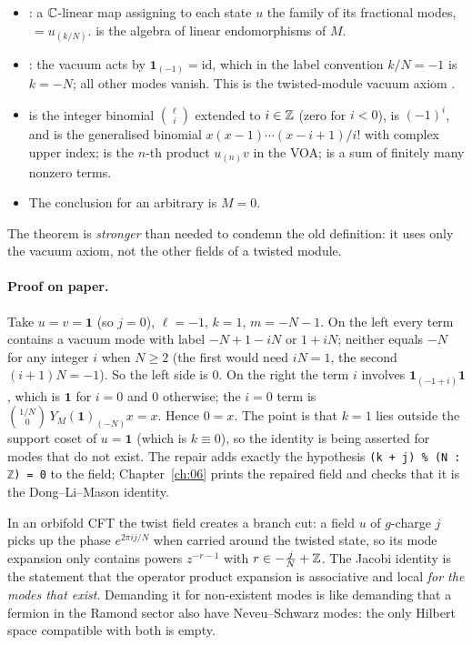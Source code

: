 \begin{dictionary}
\begin{itemize}
\item {}: a ${\mathbb{C}}$-linear map assigning to each state $u$ the family
  of its fractional modes, $\,=u_{(k/N)}$.  is the algebra of linear
  endomorphisms of $M$.
\item {}: the vacuum acts by $\mathbf 1_{(-1)}=\mathrm{id}$, which in the label convention
  $k/N=-1$ is $k=-N$; all other modes vanish. This is the twisted-module vacuum axiom
  .
\item {} is the integer binomial $\binom{\ell}{i}$ extended to $i\in{\mathbb{Z}}$ (zero for
  $i<0$),  is $(-1)^i$, and  is the generalised binomial
  $x(x-1)\cdots(x-i+1)/i!$ with complex upper index;  is the $n$-th product
  $u_{(n)}v$ in the VOA;  is a sum of finitely many nonzero terms.
\item The conclusion  for an arbitrary  is $M=0$.
\end{itemize}
The theorem is \emph{stronger} than needed to condemn the old definition: it uses only the vacuum
axiom, not the other fields of a twisted module.
\end{dictionary}

\paragraph{Proof on paper.} Take $u=v=\mathbf 1$ (so $j=0$), $\ell=-1$, $k=1$, $m=-N-1$. On the left
every term contains a vacuum mode with label $-N+1-iN$ or $1+iN$; neither equals $-N$ for any
integer $i$ when $N\ge 2$ (the first would need $iN=1$, the second $(i+1)N=-1$). So the left side is
$0$. On the right the term $i$ involves $\mathbf 1_{(-1+i)}\mathbf 1$, which is $\mathbf 1$ for $i=0$
and $0$ otherwise; the $i=0$ term is $\binom{1/N}{0}\,Y_M(\mathbf 1)_{(-N)}x=x$. Hence $0=x$.
The point is that $k=1$ lies outside the support coset of $u=\mathbf 1$ (which is $k\equiv 0$), so
the identity is being asserted for modes that do not exist. The repair adds exactly the hypothesis
\texttt{(k + j) \% (N : ℤ) = 0} to the field; Chapter~\ref{ch:06} prints the repaired field and
checks that it is the Dong--Li--Mason identity.

\begin{physics}
In an orbifold CFT the twist field creates a branch cut: a field $u$ of $g$-charge $j$ picks up
the phase $e^{2\pi i j/N}$ when carried around the twisted state, so its mode expansion only
contains powers $z^{-r-1}$ with $r\in-\frac jN+{\mathbb{Z}}$. The Jacobi identity is the statement that the
operator product expansion is associative and local \emph{for the modes that exist}. Demanding it
for non-existent modes is like demanding that a fermion in the Ramond sector also have
Neveu--Schwarz modes: the only Hilbert space compatible with both is empty.
\end{physics}

